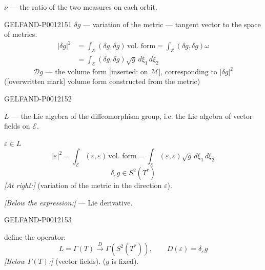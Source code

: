 \(\nu\) --- the ratio of the two measures on each orbit.


\begin{GelfandAdjacentEvidence}{GELFAND-P001215}{1}
\(\delta g\) --- variation of the metric --- tangent vector to the space of metrics.
\begin{equation*}
\begin{aligned}
|\delta g|^2
&=\int_{\mathcal E}(\delta g,\delta g)\,\text{vol. form}
=\int_{\mathcal E}(\delta g,\delta g)\omega\\
&=\int_{\mathcal E}(\delta g,\delta g)\sqrt g\,d\xi_1\,d\xi_2
\end{aligned}\tag{8}
\end{equation*}
\begin{equation*}
\mathcal Dg\text{ --- the volume form [inserted: on }\mathcal M\text{], corresponding to }|\delta g|^2\tag{9}
\end{equation*}
([overwritten mark] volume form constructed from the metric)
\end{GelfandAdjacentEvidence}
\begin{GelfandAdjacentEvidence}{GELFAND-P001215}{2}


\(L\) --- the Lie algebra of the diffeomorphism group, i.e. the Lie algebra of vector fields on \(\mathcal E\).

\(\varepsilon\in L\)
\begin{equation*}
|\varepsilon|^2=\int_{\mathcal E}(\varepsilon,\varepsilon)\,\text{vol. form}
=\int_{\mathcal E}(\varepsilon,\varepsilon)\sqrt g\,d\xi_1\,d\xi_2\tag{10}
\end{equation*}
\begin{equation*}
\delta_\varepsilon g\in S^2(T^*)\tag{11}
\end{equation*}
\textit{[At right:]} (variation of the metric in the direction \(\varepsilon\)).

\textit{[Below the expression:]} --- Lie derivative.
\end{GelfandAdjacentEvidence}
\begin{GelfandAdjacentEvidence}{GELFAND-P001215}{3}


define the operator:
\begin{equation*}
L=\Gamma(T)\overset{D}{\longrightarrow}\Gamma(S^2(T^*)),
\qquad D(\varepsilon)=\delta_\varepsilon g\tag{12}
\end{equation*}
\textit{[Below \(\Gamma(T)\):]} (vector fields). (\(g\) is fixed).
\end{GelfandAdjacentEvidence}
